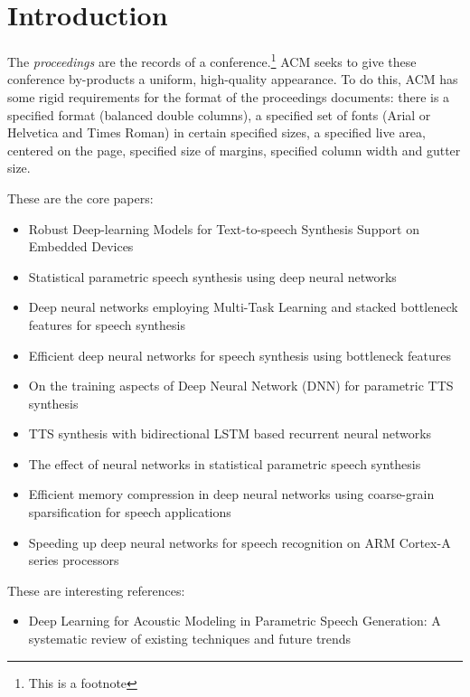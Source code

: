 
\section{Introduction}

The \textit{proceedings} are the records of a conference.\footnote{This is a footnote}  ACM seeks to give these conference by-products a uniform, high-quality appearance.  To do this, ACM has some rigid requirements for the format of the proceedings documents: there is a specified format (balanced double columns), a specified set of fonts (Arial or
Helvetica and Times Roman) in certain specified sizes, a specified live area, centered on the page, specified size of margins, specified column width and gutter size.

These are the core papers: 
\begin{itemize} %
	\item Robust Deep-learning Models for Text-to-speech Synthesis Support on Embedded Devices \cite{boros:robust}
	\item Statistical parametric speech synthesis using deep neural networks \cite{ze:statistical}
	\item Deep neural networks employing Multi-Task Learning and stacked bottleneck features for speech synthesis \cite{wu:deep}
	\item Efficient deep neural networks for speech synthesis using bottleneck features \cite{joo:efficient}
	\item On the training aspects of Deep Neural Network (DNN) for parametric TTS synthesis \cite{qian:training}
	\item TTS synthesis with bidirectional LSTM based recurrent neural networks \cite{fan:tts}
	\item The effect of neural networks in statistical parametric speech synthesis \cite{hashimoto:effect}
	\item Efficient memory compression in deep neural networks using coarse-grain sparsification for speech applications \cite{kadetotad:efficient}
	\item Speeding up deep neural networks for speech recognition on ARM Cortex-A series processors \cite{xing:speeding}
\end{itemize}

These are interesting references:

\begin{itemize} %
	\item Deep Learning for Acoustic Modeling in Parametric Speech Generation: A systematic review of existing techniques and future trends \cite{ling:deep}
\end{itemize}
